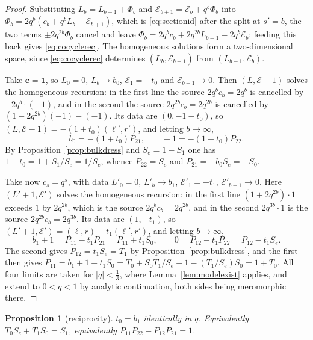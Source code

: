 \documentclass[11pt]{article}
\theoremstyle{plain}
\newtheorem{proposition}[theorem]{Proposition}
\theoremstyle{definition}
\theoremstyle{remark}
\begin{document}
\begin{proof}
Substituting $L_b=L_{b-1}+\Phi_b$ and $\mathcal E_{b+1}=\mathcal E_b+q^b\Phi_b$ into
$\Phi_b=2q^b(c_b+q^bL_b-\mathcal E_{b+1})$, which is \eqref{eq:sectionid} after the split at
$s'=b$, the two terms $\pm2q^{2b}\Phi_b$ cancel and leave
$\Phi_b=2q^bc_b+2q^{2b}L_{b-1}-2q^b\mathcal E_b$; feeding this back gives \eqref{eq:cocyclerec}.
The homogeneous solutions form a two-dimensional space, since \eqref{eq:cocyclerec} determines
$(L_b,\mathcal E_{b+1})$ from $(L_{b-1},\mathcal E_b)$.

Take $\mathbf c=\mathbf 1$, so $L_0=0$, $L_b\to b_0$, $\mathcal E_1=-t_0$ and
$\mathcal E_{b+1}\to0$. Then $(L,\mathcal E-1)$ solves the homogeneous recursion: in the first line
the source $2q^bc_b=2q^b$ is cancelled by $-2q^b\cdot(-1)$, and in the second the source
$2q^{2b}c_b=2q^{2b}$ is cancelled by $(1-2q^{2b})(-1)-(-1)$. Its data are $(0,-1-t_0)$, so
$(L,\mathcal E-1)=-(1+t_0)(\ell',r')$, and letting $b\to\infty$,
\[
   b_0=-(1+t_0)P_{21},\qquad -1=-(1+t_0)P_{22} .
\]
By Proposition~\ref{prop:bulkdress} and $S_e=1-S_1$ one has $1+t_0=1+S_1/S_e=1/S_e$, whence
$P_{22}=S_e$ and $P_{21}=-b_0S_e=-S_0$.

Take now $c_s=q^s$, with data $L'_0=0$, $L'_b\to b_1$, $\mathcal E'_1=-t_1$,
$\mathcal E'_{b+1}\to0$. Here $(L'+1,\mathcal E')$ solves the homogeneous recursion: in the first
line $(1+2q^{2b})\cdot1$ exceeds $1$ by $2q^{2b}$, which is the source $2q^bc_b=2q^{2b}$, and in
the second $2q^{3b}\cdot1$ is the source $2q^{2b}c_b=2q^{3b}$. Its data are $(1,-t_1)$, so
$(L'+1,\mathcal E')=(\ell,r)-t_1(\ell',r')$, and letting $b\to\infty$,
\[
   b_1+1=P_{11}-t_1P_{21}=P_{11}+t_1S_0,\qquad 0=P_{12}-t_1P_{22}=P_{12}-t_1S_e .
\]
The second gives $P_{12}=t_1S_e=T_1$ by Proposition~\ref{prop:bulkdress}, and the first then gives
$P_{11}=b_1+1-t_1S_0=T_0+S_0T_1/S_e+1-(T_1/S_e)S_0=1+T_0$. All four limits are taken for
$|q|<\tfrac13$, where Lemma~\ref{lem:modelexist} applies, and extend to $0<q<1$ by analytic
continuation, both sides being meromorphic there.
\end{proof}

\begin{proposition}[reciprocity]\label{prop:recip}
$t_0=b_1$ identically in $q$. Equivalently $T_0S_e+T_1S_0=S_1$, equivalently
$P_{11}P_{22}-P_{12}P_{21}=1$.
\end{proposition}
\end{document}
